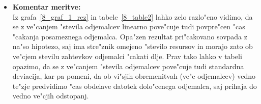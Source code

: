 \begin{itemize}
    \pagebreak
	\item \textbf{Komentar meritve: } \\ 
		Iz grafa~\ref{8_graf_1_rez} in tabele~\ref{8_table2} lahko zelo razlo"cno vidimo, da se z ve"canjem "stevila odjemalcev linearno pove"cuje tudi povpre"cen "cas "cakanja posameznega odjemalca. Opa"zen rezultat pri"cakovano sovpada z na"so hipotezo, saj ima stre"znik omejeno "stevilo resursov in morajo zato ob ve"cjem stevilu zahtevkov odjemalci  "cakati dlje. Prav tako lahko v tabeli opazimo, da se z ve"canjem "stevila odjemalcev pove"cuje tudi standardna deviacija, kar pa pomeni, da ob vi"sjih obremenitvah (ve"c odjemalcev) vedno te"zje predvidimo "cas obdelave datotek dolo"cenega odjemalca, saj prihaja do vedno ve"cjih odstopanj.
\end{itemize}

\newpage
